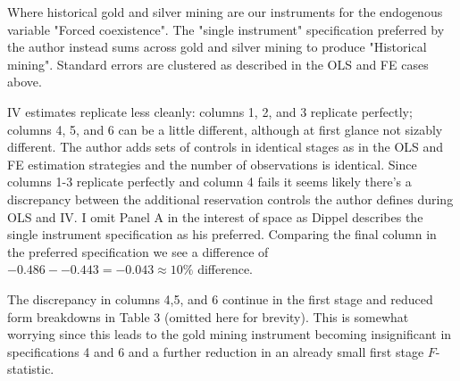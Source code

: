 \documentclass{article}
\begin{document}
Where historical gold and silver mining are our instruments for the endogenous variable "Forced coexistence". The "single instrument" specification preferred by the author instead sums across gold and silver mining to produce "Historical mining".
Standard errors are clustered as described in the OLS and FE cases above.


IV estimates replicate less cleanly: columns 1, 2, and 3 replicate perfectly; columns 4, 5, and 6 can be a little different, although at first glance not sizably different. The author 
adds sets of controls in identical stages as in the OLS and FE estimation strategies and the number of observations is identical. Since columns 1-3 
replicate perfectly and column 4 fails it seems likely there's a discrepancy between the additional reservation controls the author defines during OLS
and IV. I omit Panel A in the interest of space as Dippel describes the single instrument specification as his preferred. Comparing the final column in the preferred specification 
we see a difference of $-0.486 - - 0.443 = -0.043 \approx 10\%$ difference.

% 


 The discrepancy in columns 4,5, and 6 continue in the first stage and reduced form breakdowns in Table 3 (omitted here for brevity). This is
somewhat worrying since this leads to the gold mining instrument becoming insignificant in specifications 4 and 6 and a further reduction in an already small 
first stage $F$-statistic. 
\end{document}
